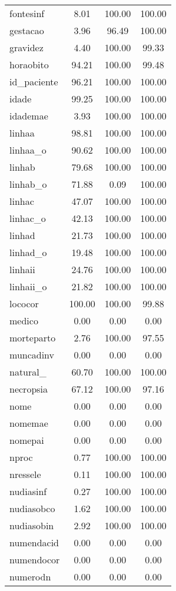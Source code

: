 \documentclass[
  12,
  table]{proadi}
\begin{document}
\begin{longtable}{lccc}
fontesinf & 8.01 & 100.00 & 100.00\\
gestacao & 3.96 & 96.49 & 100.00\\
gravidez & 4.40 & 100.00 & 99.33\\
horaobito & 94.21 & 100.00 & 99.48\\
\addlinespace
id\_paciente & 96.21 & 100.00 & 100.00\\
idade & 99.25 & 100.00 & 100.00\\
idademae & 3.93 & 100.00 & 100.00\\
linhaa & 98.81 & 100.00 & 100.00\\
linhaa\_o & 90.62 & 100.00 & 100.00\\
\addlinespace
linhab & 79.68 & 100.00 & 100.00\\
linhab\_o & 71.88 & 0.09 & 100.00\\
linhac & 47.07 & 100.00 & 100.00\\
linhac\_o & 42.13 & 100.00 & 100.00\\
linhad & 21.73 & 100.00 & 100.00\\
\addlinespace
linhad\_o & 19.48 & 100.00 & 100.00\\
linhaii & 24.76 & 100.00 & 100.00\\
linhaii\_o & 21.82 & 100.00 & 100.00\\
lococor & 100.00 & 100.00 & 99.88\\
medico & 0.00 & 0.00 & 0.00\\
\addlinespace
morteparto & 2.76 & 100.00 & 97.55\\
muncadinv & 0.00 & 0.00 & 0.00\\
natural\_ & 60.70 & 100.00 & 100.00\\
necropsia & 67.12 & 100.00 & 97.16\\
nome & 0.00 & 0.00 & 0.00\\
\addlinespace
nomemae & 0.00 & 0.00 & 0.00\\
nomepai & 0.00 & 0.00 & 0.00\\
nproc & 0.77 & 100.00 & 100.00\\
nressele & 0.11 & 100.00 & 100.00\\
nudiasinf & 0.27 & 100.00 & 100.00\\
\addlinespace
nudiasobco & 1.62 & 100.00 & 100.00\\
nudiasobin & 2.92 & 100.00 & 100.00\\
numendacid & 0.00 & 0.00 & 0.00\\
numendocor & 0.00 & 0.00 & 0.00\\
numerodn & 0.00 & 0.00 & 0.00\\

\end{longtable}
\end{document}
